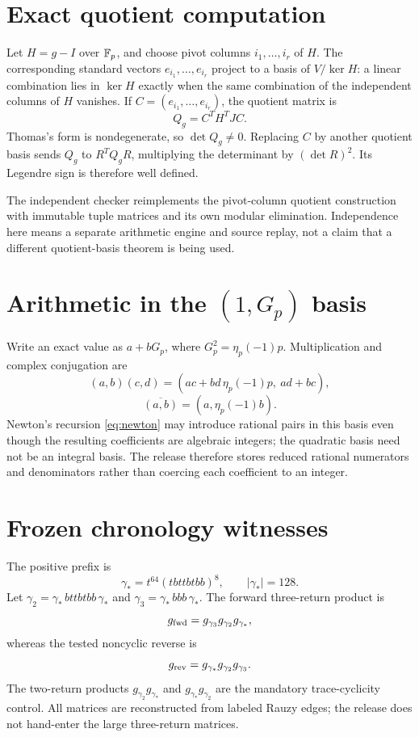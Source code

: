 \section{Exact quotient computation}
\label{app:quotient}

Let \(H=g-I\) over \(\mathbb{F}_p\), and choose pivot columns
\(i_1,\ldots,i_r\) of \(H\).  The corresponding standard vectors
\(e_{i_1},\ldots,e_{i_r}\) project to a basis of
\(V/\ker H\): a linear combination lies in \(\ker H\) exactly when the same
combination of the independent columns of \(H\) vanishes.  If
\(C=(e_{i_1},\ldots,e_{i_r})\), the quotient matrix is
\[
Q_g=C^TH^TJC.
\]
Thomas's form is nondegenerate, so \(\det Q_g\ne0\).  Replacing \(C\) by
another quotient basis sends \(Q_g\) to \(R^TQ_gR\), multiplying the
determinant by \((\det R)^2\).  Its Legendre sign is therefore well defined.

The independent checker reimplements the pivot-column quotient construction
with immutable tuple matrices and its own modular elimination.  Independence
here means a separate arithmetic engine and source replay, not a claim that a
different quotient-basis theorem is being used.

\section{Arithmetic in the \((1,G_p)\) basis}

Write an exact value as \(a+bG_p\), where
\(G_p^2=\eta_p(-1)p\).  Multiplication and complex conjugation are
\[
(a,b)(c,d)
=(ac+bd\,\eta_p(-1)p,\ ad+bc),
\]
\[
\overline{(a,b)}=(a,\eta_p(-1)b).
\]
Newton's recursion \cref{eq:newton} may introduce rational pairs in this
basis even though the resulting coefficients are algebraic integers; the
quadratic basis need not be an integral basis.  The release therefore stores
reduced rational numerators and denominators rather than coercing each
coefficient to an integer.

\section{Frozen chronology witnesses}

The positive prefix is
\[
\gamma_*=t^{64}(tbttbtbb)^8,
\qquad |\gamma_*|=128.
\]
Let \(\gamma_2=\gamma_*\,bttbtbb\,\gamma_*\) and
\(\gamma_3=\gamma_*\,bbb\,\gamma_*\).  The forward three-return product is
\[
g_{\rm fwd}=g_{\gamma_3}g_{\gamma_2}g_{\gamma_*},
\]
whereas the tested noncyclic reverse is
\[
g_{\rm rev}=g_{\gamma_*}g_{\gamma_2}g_{\gamma_3}.
\]
The two-return products
\(g_{\gamma_2}g_{\gamma_*}\) and
\(g_{\gamma_*}g_{\gamma_2}\) are the mandatory trace-cyclicity control.
All matrices are reconstructed from labeled Rauzy edges; the release does not
hand-enter the large three-return matrices.

